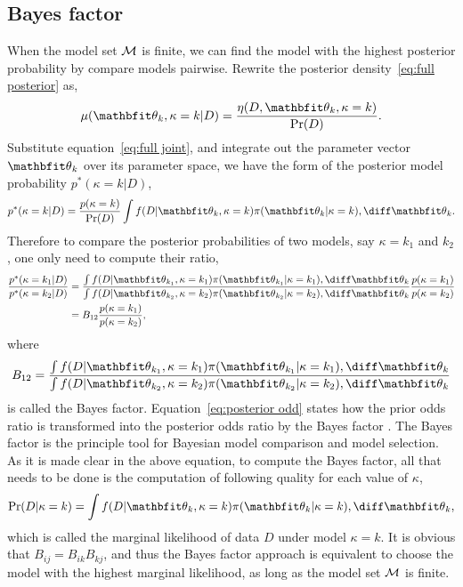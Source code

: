 \documentclass[10pt, hyper, bib, fontset=Lucida,
linespread=1.3, typearearatio=0.75]{marticle}
\begin{document}
\subsection{Bayes factor}
\label{sub:Bayes factor}

When the model set $\mathcal{M}$ is finite, we can find the model with the highest
posterior probability by compare models pairwise. Rewrite the posterior
density~\eqref{eq:full posterior} as,
\begin{equation}
  \mu(\bth_k,\kappa=k|D) = \frac{\eta(D,\bth_k,\kappa=k)}{\Pr(D)}.
\end{equation}
Substitute equation~\eqref{eq:full joint}, and integrate out the parameter
vector $\bth_k$ over its parameter space, we have the form of the posterior
model probability $p^*(\kappa=k|D)$,
\begin{equation}
  p^*(\kappa=k|D) = \frac{p(\kappa = k)}{\Pr(D)}
  \int f(D|\bth_k,\kappa = k)\pi(\bth_k|\kappa = k)\dd\bth_k.
\end{equation}
Therefore to compare the posterior probabilities of two models, say $\kappa =
k_1$ and $k_2$, one only need to compute their ratio,
\begin{align}
  \frac{p^*(\kappa = k_1|D)}{p^*(\kappa = k_2|D)} &= \frac
  {\int f(D|\bth_{k_1},\kappa=k_1)\pi(\bth_{k_1}|\kappa=k_1)\dd\bth_k}
  {\int f(D|\bth_{k_2},\kappa=k_2)\pi(\bth_{k_2}|\kappa=k_2)\dd\bth_k}
  \frac{p(\kappa=k_1)}{p(\kappa=k_2)} \notag\\
  & = B_{12} \frac{p(\kappa=k_1)}{p(\kappa=k_2)},
  \label{eq:posterior odd}
\end{align}
where
\begin{equation}
  B_{12} = \frac
  {\int f(D|\bth_{k_1},\kappa=k_1)\pi(\bth_{k_1}|\kappa=k_1)\dd\bth_k}
  {\int f(D|\bth_{k_2},\kappa=k_2)\pi(\bth_{k_2}|\kappa=k_2)\dd\bth_k}
  \label{eq:bayes factor}
\end{equation}
is called the Bayes factor. Equation~\eqref{eq:posterior odd} states how the
prior odds ratio is transformed into the posterior odds ratio by the Bayes
factor \parencite{Kass:1995vb}. The Bayes factor is the principle tool for
Bayesian model comparison and model selection. As it is made clear in the
above equation, to compute the Bayes factor, all that needs to be done is the
computation of following quality for each value of $\kappa$,
\begin{equation}
  \Pr(D|\kappa = k)
  = \int f(D|\bth_k,\kappa=k)\pi(\bth_k|\kappa=k)\dd\bth_k,
  \label{eq:marginal likelihood}
\end{equation}
which is called the marginal likelihood of data $D$ under model $\kappa = k$.
It is obvious that $B_{ij} = B_{ik} B_{kj}$, and thus the Bayes factor
approach is equivalent to choose the model with the highest marginal
likelihood, as long as the model set $\mathcal{M}$ is finite.
\end{document}

